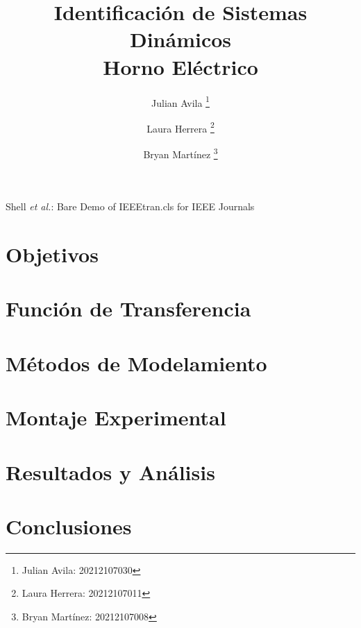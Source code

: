 \documentclass[journal, table]{IEEEtran}
\begin{document}
\title{Identificación de Sistemas Dinámicos \\
  \small{Horno Eléctrico}}

\author[*]{Julian Avila
  \thanks{Julian Avila: 20212107030}}
\author[*]{Laura Herrera
  \thanks{Laura Herrera: 20212107011}}
\author[*]{Bryan Martínez
  \thanks{Bryan Martínez: 20212107008}}


\markboth{}
{Shell \MakeLowercase{\textit{et al.}}: Bare Demo of IEEEtran.cls for IEEE Journals}

\maketitle



\section{Objetivos}


\section{Función de Transferencia}


\section{Métodos de Modelamiento}


\section{Montaje Experimental}


\section{Resultados y Análisis}


\section{Conclusiones}


\printbibliography
\end{document}
